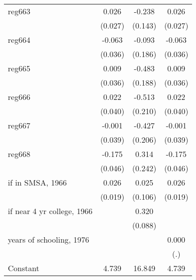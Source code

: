 \begin{table}[htbp]
\begin{tabular}{l*{3}{c}}
\addlinespace
reg663              &       0.026         &      -0.238\sym{*}  &       0.026         \\
                    &     (0.027)         &     (0.143)         &     (0.027)         \\
\addlinespace
reg664              &      -0.063\sym{*}  &      -0.093         &      -0.063\sym{*}  \\
                    &     (0.036)         &     (0.186)         &     (0.036)         \\
\addlinespace
reg665              &       0.009         &      -0.483\sym{**} &       0.009         \\
                    &     (0.036)         &     (0.188)         &     (0.036)         \\
\addlinespace
reg666              &       0.022         &      -0.513\sym{**} &       0.022         \\
                    &     (0.040)         &     (0.210)         &     (0.040)         \\
\addlinespace
reg667              &      -0.001         &      -0.427\sym{**} &      -0.001         \\
                    &     (0.039)         &     (0.206)         &     (0.039)         \\
\addlinespace
reg668              &      -0.175\sym{***}&       0.314         &      -0.175\sym{***}\\
                    &     (0.046)         &     (0.242)         &     (0.046)         \\
\addlinespace
=1 if in SMSA, 1966 &       0.026         &       0.025         &       0.026         \\
                    &     (0.019)         &     (0.106)         &     (0.019)         \\
\addlinespace
=1 if near 4 yr college, 1966&                     &       0.320\sym{***}&                     \\
                    &                     &     (0.088)         &                     \\
\addlinespace
years of schooling, 1976&                     &                     &       0.000         \\
                    &                     &                     &         (.)         \\
\addlinespace
Constant            &       4.739\sym{***}&      16.849\sym{***}&       4.739\sym{***}\\

\end{tabular}
\end{table}
